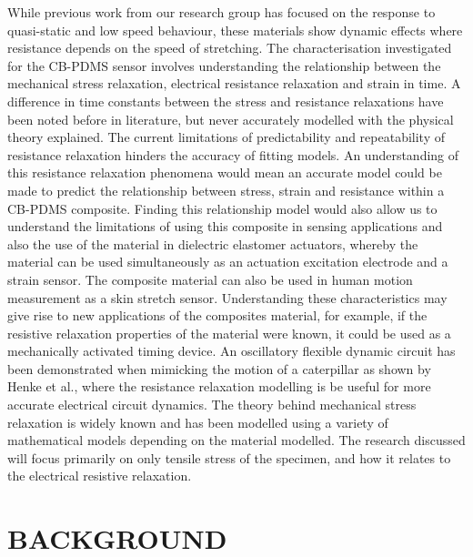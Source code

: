 While previous work from our research group \cite{Giffney2017,Devaraj2018} has focused on the response to quasi-static and low speed behaviour, these materials show dynamic effects where resistance depends on the speed of stretching. The characterisation investigated for the CB-PDMS sensor involves understanding the relationship between the mechanical stress relaxation, electrical resistance relaxation and strain in time. A difference in time constants between the stress and resistance relaxations have been noted before in literature\cite{Kost1994,Wang2013,Maddipatla2017,Wang2004}, but never accurately modelled with the physical theory explained. The current limitations of predictability and repeatability of resistance relaxation hinders the accuracy of fitting models. An understanding of this resistance relaxation phenomena would mean an accurate model could be made to predict the relationship between stress, strain and resistance within a CB-PDMS composite. Finding this relationship model would also allow us to understand the limitations of using this composite in sensing applications and also the use of the material in dielectric elastomer actuators, whereby the material can be used simultaneously as an actuation excitation electrode and a strain sensor. The composite material can also be used in human motion measurement as a skin stretch sensor. Understanding these characteristics may give rise to new applications of the composites material, for example, if the resistive relaxation properties of the material were known, it could be used as a mechanically activated timing device. An oscillatory flexible dynamic circuit has been demonstrated when mimicking the motion of a caterpillar as shown by Henke et al.\cite{Henke2018}, where the resistance relaxation modelling is be useful for more accurate electrical circuit dynamics. The theory behind mechanical stress relaxation is widely known and has been modelled using a variety of mathematical models \cite{Fung1993} depending on the material modelled. The research discussed will focus primarily on only tensile stress of the specimen, and how it relates to the electrical resistive relaxation. 



\section*{BACKGROUND}


